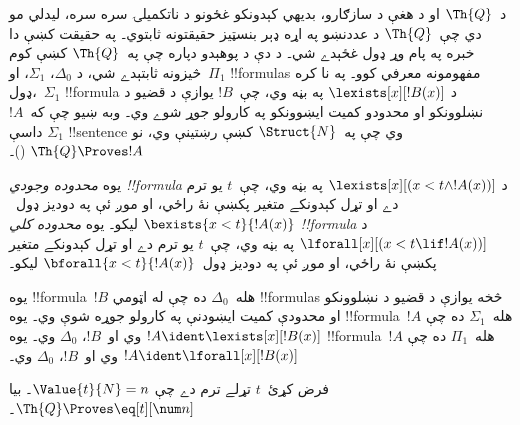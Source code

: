 \documentclass[../../../include/open-logic-section]{subfiles}
\begin{document}

د~$\Th{Q}$ او د هغې د سازګارو، بديهي کېدونکو غځونو د ناتکميلۍ
سره سره، ليدلي مو دي چې~$\Th{Q}$ د عددنښو په اړه ډېر بنسټيز
حقيقتونه ثابتوي۔ په حقيقت کښې دا خبره په پام وړ ډول غځېدے شي۔ د دې
د پوهېدو دپاره چې په~$\Th{Q}$ کښې کوم څيزونه ثابتېدے شي، د
$\Delta_0$، $\Sigma_1$، او~$\Pi_1$ !!{formula}s مفهومونه معرفي
کوو۔ په نا کره ډول،~$\Sigma_1$ !!{formula} د
$\lexists[x][!B(x)]$ په بڼه وي، چې~$!B$ يوازې د قضيو د نښلوونکو او
محدودو کمیت ايښوونکو په کارولو جوړ شوے وي۔ وبه ښيو چې که~$!A$ داسې
$\Sigma_1$ !!{sentence} وي چې په~$\Struct{N}$ کښې رښتينې وي، نو
$\Th{Q} \Proves !A$ ()۔

\begin{defn}
يوه \emph{محدوده وجودي !!{formula}} د
$\lexists[x][(x < t \land !A(x))]$ په بڼه وي، چې~$t$ يو ترم دے او تړل کېدونکے متغير پکښې نۀ راځي، او
موږ ئې په دوديز ډول~$\bexists{x < t}{!A(x)}$ ليکو۔
%
يوه \emph{محدوده کلي !!{formula}} د
$\lforall[x][(x < t \lif !A(x))]$ په بڼه وي، چې~$t$ يو ترم دے او تړل کېدونکے متغير پکښې نۀ راځي، او
موږ ئې په دوديز ډول~$\bforall{x < t}{!A(x)}$ ليکو۔
\end{defn}

\begin{defn}
يوه !!{formula}~$!B$ هله~$\Delta_0$ ده چې له اټومي
!!{formula}s څخه يوازې د قضيو د نښلوونکو او محدودې کمیت ايښودنې په
کارولو جوړه شوې وي۔
%
يوه !!{formula}~$!A$ هله~$\Sigma_1$ ده چې
$!A \ident \lexists[x][!B(x)]$ وي او~$!B$، $\Delta_0$ وي۔
%
يوه !!{formula}~$!A$ هله~$\Pi_1$ ده چې
$!A \ident \lforall[x][!B(x)]$ وي او~$!B$، $\Delta_0$ وي۔
\end{defn}

\begin{lem}
 فرض کړئ~$t$ تړلے ترم دے چې
$\Value{t}{N} = n$۔ بيا $\Th{Q} \Proves \eq[t][\num n]$۔
\end{lem}
\end{document}
